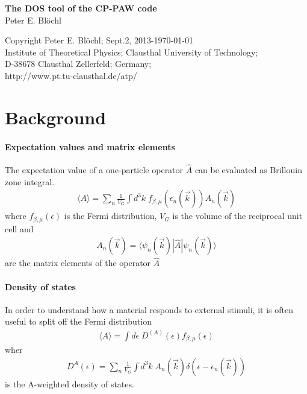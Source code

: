\documentclass[11pt,a4paper]{report}
\begin{document}
\begin{titlepage}
\begin{center}
\vspace*{3.5cm}
{\huge \textbf{The DOS tool of the CP-PAW code}}\\
\vspace{0.5cm}
{\large Peter E. Bl\"ochl}
\vspace{0.5cm} 
\end{center}

\vfill
\begin{center}
Copyright Peter E. Bl\"ochl; Sept.2, 2013-\today\\
{\small
Institute of Theoretical Physics;
Clausthal University of Technology;\\ 
D-38678 Clausthal Zellerfeld; Germany;\\
http://www.pt.tu-clausthal.de/atp/}
\end{center}
\end{titlepage}
\noindent            
\tableofcontents
\chapter{Background}
\subsubsection{Expectation values and matrix elements}
The expectation value of a one-particle operator $\hat{A}$ can be evaluated
as Brillouin zone integral.
\begin{eqnarray}
\langle{A}\rangle
=\sum_n\frac{1}{V_G}\int d^3k\; f_{\beta,\mu}(\epsilon_n(\vec{k}))
A_{n}(\vec{k})
\end{eqnarray}
where $f_{\beta,\mu}(\epsilon)$ is the Fermi distribution, $V_G$ is
the volume of the reciprocal unit cell and
\begin{eqnarray}
A_{n}(\vec{k})=\langle\psi_n(\vec{k})|\hat{A}|\psi_n(\vec{k})\rangle
\end{eqnarray}
are the matrix elements of the operator $\hat{A}$

\subsubsection{Density of states}
In order to understand how a material responds to external stimuli, it
is often useful to split off the Fermi distribution
\begin{eqnarray}
\langle{A}\rangle=\int d\epsilon\; D^{(A)}(\epsilon)
f_{\beta,\mu}(\epsilon)
\end{eqnarray}
wher
\begin{eqnarray}
D^{A}(\epsilon)=
\sum_n\frac{1}{V_G}\int d^3k\; A_{n}(\vec{k})\delta(\epsilon-\epsilon_n(\vec{k}))
\end{eqnarray}
is the A-weighted density of states.
\end{document}
